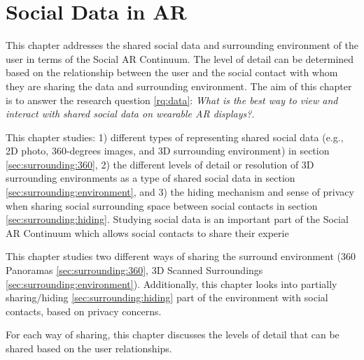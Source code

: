 \chapter{Social Data in AR} 
\label{ch:data} 

This chapter addresses the shared social data and surrounding environment of the user in terms of the Social AR Continuum. The level of detail can be determined based on the relationship between the user and the social contact with whom they are sharing the data and surrounding environment. The aim of this chapter is to answer the research question \ref{rq:data}: \textit{What is the best way to view and interact with shared social data on wearable AR displays?}. 


This chapter studies: 1) different types of representing shared social data (e.g., 2D photo, 360-degrees images, and 3D surrounding environment) in section \ref{sec:surrounding:360}, 2) the different levels of detail or resolution of 3D surrounding environments as a type of shared social data in section \ref{sec:surrounding:environment}, and 3) the hiding mechanism and sense of privacy when sharing social surrounding space between social contacts in section \ref{sec:surrounding:hiding}. Studying social data is an important part of the Social AR Continuum which allows social contacts to share their experie

This chapter studies two different ways of sharing the surround environment (360 Panoramas \ref{sec:surrounding:360}, 3D Scanned Surroundings \ref{sec:surrounding:environment}). Additionally, this chapter looks into partially sharing/hiding \ref{sec:surrounding:hiding} part of the environment with social contacts, based on privacy concerns. 

For each way of sharing, this chapter discusses the levels of detail that can be shared based on the user relationships. 





